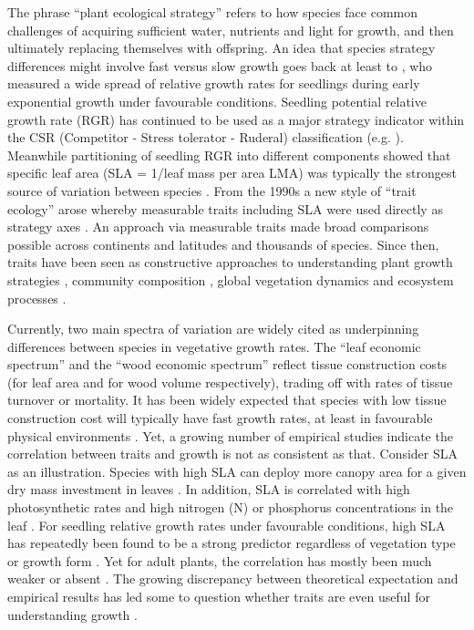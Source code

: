 \documentclass[a4paper,11pt]{article}
\begin{document}
The phrase ``plant ecological strategy'' refers to how species face common challenges of acquiring sufficient water, nutrients and light for growth, and then ultimately replacing themselves with offspring. An idea that species strategy differences might involve fast versus slow growth goes back at least to \citet{Grime:1975gr}, who measured a wide spread of relative growth rates for seedlings during early exponential growth under favourable conditions. Seedling potential relative growth rate (RGR) has continued to be used as a major strategy indicator within the CSR (Competitor - Stress tolerator - Ruderal) classification (e.g. \citealt{grime1979plant, Grime:1997wm}). Meanwhile partitioning of seedling RGR into different components showed that specific leaf area (SLA = 1/leaf mass per area LMA) was typically the strongest source of variation between species \citep{Poorter:1989tx, Rees:2010gk}. From the 1990s a new style of ``trait ecology'' arose whereby measurable traits including SLA were used directly as strategy axes \citep{Westoby:2002ft}. An approach via measurable traits made broad comparisons possible across continents and latitudes and thousands of species. Since then, traits have been seen as constructive approaches to understanding plant growth strategies \citep{Grime:1977kc,Chapin:1980gz}, community composition \citep{Lavorel:2002ff,Shipley:2006ie}, global vegetation dynamics \citep{Scheiter:2013ed} and ecosystem processes \citep{Lavorel:2002ff}.

Currently, two main spectra of variation are widely cited as underpinning differences between species in vegetative growth rates. The ``leaf economic spectrum'' \citep{Wright:2004jb} and the ``wood economic spectrum'' \citep{Chave:2009iy} reflect tissue construction costs (for leaf area and for wood volume respectively), trading off with rates of tissue turnover or mortality. It has been widely expected that species with low tissue construction cost will typically have fast growth rates, at least in favourable physical environments \citep[e.g.][]{MullerLandau:2004dc,Poorter:2008iu,Chave:2009iy,Larjavaara:2010bn,Iida:2012jb,Paine:2015df}. Yet, a growing number of empirical studies indicate the correlation between traits and growth is not as consistent as that. Consider SLA as an illustration. Species with high SLA can deploy more canopy area for a given dry mass investment in leaves \citep{Poorter:1999wd, Reich:1992wm}. In addition, SLA is correlated with high photosynthetic rates and high nitrogen (N) or phosphorus concentrations in the leaf \citep{Wright:2004jb}. For seedling relative growth rates under favourable conditions, high SLA has repeatedly been found to be a strong predictor regardless of vegetation type or growth form \citep{Lambers:1992bj,Reich:1992wm,Grime:1997wm,Poorter:1999wd,Wright:1999ds}. Yet for adult plants, the correlation has mostly been much weaker or absent \citep{coomes_comparison_1998,Poorter:2008iu,Aiba:2009ft,Easdale:2009gv,Wright:2010tp}. The growing discrepancy between theoretical expectation and empirical results has led some to question whether traits are even useful for understanding growth \citep{Wright:2010tp, Paine:2015df}.
\end{document}
